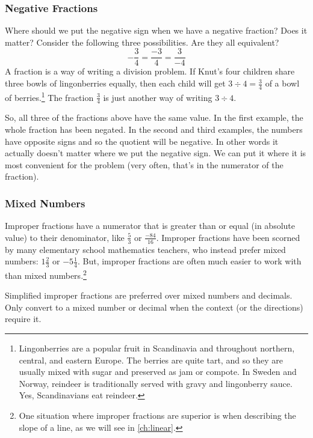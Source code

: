 \subsubsection*{Negative Fractions}

Where should we put the negative sign when we have a negative fraction? Does it matter? Consider the following three possibilities. Are they all equivalent? \[ -\frac{3}{4} = \frac{-3}{4} = \frac{3}{-4}\]
A fraction is a way of writing a division problem. If Knut's four children share three bowls of lingonberries equally, then each child will get $3\div4 = \frac{3}{4}$ of a bowl of berries.\footnote{Lingonberries are a popular fruit in Scandinavia and throughout northern, central, and eastern Europe. The berries are quite tart, and so they are usually mixed with sugar and preserved as jam or compote. In Sweden and Norway, reindeer is traditionally served with gravy and lingonberry sauce. Yes, Scandinavians eat reindeer.} The fraction $\frac{3}{4}$ is just another way of writing $3 \div 4$.

So, all three of the fractions above have the same value. In the first example, the whole fraction has been negated. In the second and third examples, the numbers have opposite signs and so the quotient will be negative. In other words it actually doesn't matter where we put the negative sign. We can put it where it is most convenient for the problem (very often, that's in the numerator of the fraction).

\subsubsection*{Mixed Numbers}

Improper fractions have a numerator that is greater than or equal (in absolute value) to their denominator, like $\frac{5}{3}$ or $\frac{-84}{16}$. Improper fractions have been scorned by many elementary school mathematics teachers, who instead prefer mixed numbers: $1\frac{2}{3}$ or $-5\frac{1}{4}$. But, improper fractions are often much easier to work with than mixed numbers.\footnote{One situation where improper fractions are superior is when describing the slope of a line, as we will see in \cref{ch:linear}.}

\begin{boxedcriteria}
Simplified \glspl{improper fraction} are preferred over \glspl{mixed number} and decimals. Only convert to a mixed number or decimal when the context (or the directions) require it.
\end{boxedcriteria}

